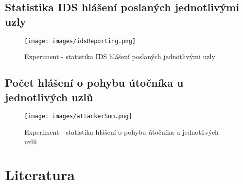 \documentclass[11pt,final,twoside]{fithesis2}
\begin{document}
\newpage
\section{Statistika IDS hlášení poslaných jednotlivými uzly }
\begin{figure}[h]
     \centering
     \texttt{[image: images/idsReporting.png]}
     \caption{Experiment - statistika IDS hlášení poslaných jednotlivými uzly}
     \label{img:reporting}
\end{figure}

\newpage
\section{Počet hlášení o pohybu útočníka u jednotlivých uzlů}
\begin{figure}[h]
     \centering
     \texttt{[image: images/attackerSum.png]}
     \caption{Experiment - statistika hlášení o pohybu útočníka u jednotlivých uzlů}
     \label{img:attacker}
\end{figure}



\begingroup
\def\tmpchapter{0}
\renewcommand{\chaptername}{}
\renewcommand{\thechapter}{}
\chapter{Literatura}
\renewcommand{\chapter}[2]{}%




\endgroup



\end{document}
